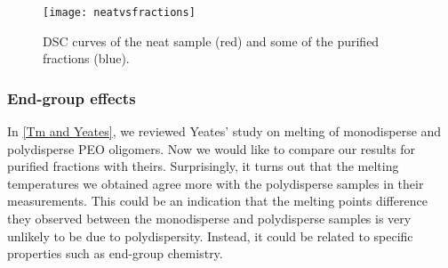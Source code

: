 \begin{figure}[H]
\center
\texttt{[image: neatvsfractions]}
\caption{DSC curves of the neat sample (red) and some of the purified fractions (blue).}
\label{fig:neatvsfractions}
\end{figure}

\subsubsection{End-group effects}

In \ref{Tm and Yeates}, we reviewed Yeates' study on melting of monodisperse and polydisperse PEO oligomers. Now we would like to compare our results for purified fractions with theirs. Surprisingly, it turns out that the melting temperatures we obtained agree more with the polydisperse samples in their measurements. This could be an indication that the melting points difference they observed between the monodisperse and polydisperse samples is very unlikely to be due to polydispersity. Instead, it could be related to specific properties such as end-group chemistry.

